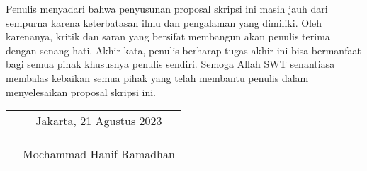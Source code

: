 Penulis menyadari bahwa penyusunan proposal skripsi ini masih jauh dari sempurna
karena keterbatasan ilmu dan pengalaman yang dimiliki. Oleh karenanya, kritik
dan saran yang bersifat membangun akan penulis terima dengan senang hati. Akhir
kata, penulis berharap tugas akhir ini bisa bermanfaat bagi semua pihak
khususnya penulis sendiri. Semoga Allah SWT senantiasa membalas kebaikan semua
pihak yang telah membantu penulis dalam menyelesaikan proposal skripsi ini.

\vspace{4cm}

\begin{tabular}{p{7.5cm}c}
	&Jakarta, 21 Agustus 2023\\
	&\\
	&\\
	&\\
	&Mochammad Hanif Ramadhan
\end{tabular}
